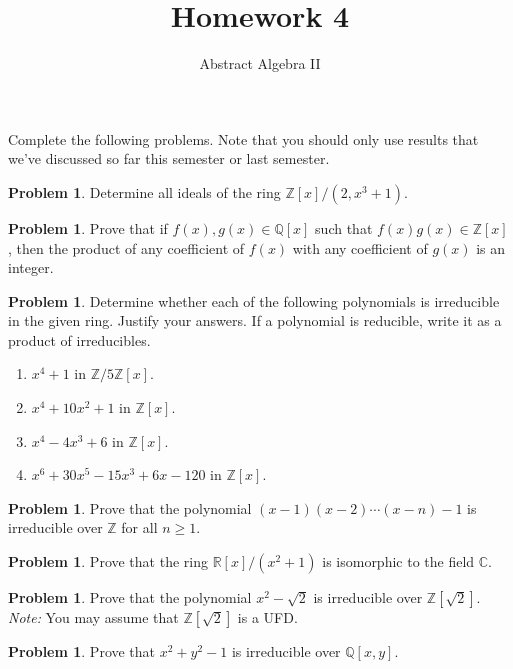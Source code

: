 \documentclass[11pt]{scrartcl}
\theoremstyle{definition}
\newtheorem{problem}[theorem]{Problem}
\newcommand{\blankline}{\pagebreak[2]\vspace{.5\baselineskip}}
\begin{document}
\title{Homework 4}
\subtitle{Abstract Algebra II}
\date{}

\maketitle
\thispagestyle{fancy}

Complete the following problems. Note that you should only use results that we've discussed so far this semester or last semester.

%

\begin{problem}
Determine all ideals of the ring $\mathbb{Z}[x]/(2,x^3+1)$.
\end{problem}

\begin{problem}
Prove that if $f(x),g(x)\in\mathbb{Q}[x]$ such that $f(x)g(x)\in\mathbb{Z}[x]$, then the product of any coefficient of $f(x)$ with any coefficient of $g(x)$ is an integer.
\end{problem}


\begin{problem}
Determine whether each of the following polynomials is irreducible in the given ring. Justify your answers. If a polynomial is reducible, write it as a product of irreducibles.
\begin{enumerate}[label=\rm{(\alph*)}]
\item $x^4+1$ in $\mathbb{Z}/5\mathbb{Z}[x]$.
\item $x^4+10x^2+1$ in $\mathbb{Z}[x]$.
\item $x^4-4x^3+6$ in $\mathbb{Z}[x]$.
\item $x^6+30x^5-15x^3+6x-120$ in $\mathbb{Z}[x]$.
\end{enumerate}
\end{problem}

\begin{problem}
Prove that the polynomial $(x-1)(x-2)\cdots (x-n)-1$ is irreducible over $\mathbb{Z}$ for all $n\geq 1$.
\end{problem}

\begin{problem}
Prove that the ring $\mathbb{R}[x]/(x^2+1)$ is isomorphic to the field $\mathbb{C}$.
\end{problem}

\begin{problem}
Prove that the polynomial $x^2-\sqrt{2}$ is irreducible over $\mathbb{Z}[\sqrt{2}]$. \emph{Note:} You may assume that $\mathbb{Z}[\sqrt{2}]$ is a UFD.
\end{problem}

\begin{problem}
Prove that $x^2+y^2-1$ is irreducible over $\mathbb{Q}[x,y]$. 
\end{problem}
\end{document}
